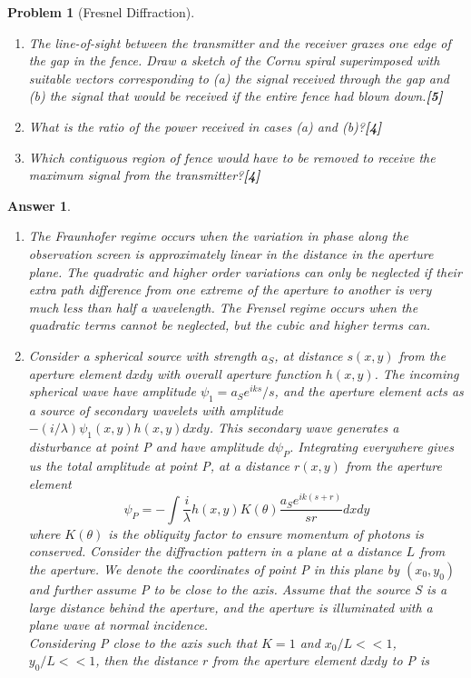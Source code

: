 \documentclass[a4paper]{article}
\newtheorem{ans}{Answer}[subsection]
\theoremstyle{new}
\newtheorem{qns}{Problem}[subsection]
\begin{document}
\begin{qns}[Fresnel Diffraction]
\begin{enumerate}[label=(\roman*)]
\begin{figure}[H]
\end{figure}
\item The line-of-sight between the transmitter and the receiver grazes one edge of the gap in the fence. Draw a sketch of the Cornu spiral superimposed with suitable vectors corresponding to (a) the signal received through the gap and (b) the signal that would be received if the entire fence had blown down.\hfill\textbf{[5]}
\item What is the ratio of the power received in cases (a) and (b)?\hfill\textbf{[4]}
\item Which contiguous region of fence would have to be removed to receive the maximum signal from the transmitter?\hfill\textbf{[4]}
\end{enumerate}
\end{qns}
\newpage
\begin{ans}\leavevmode
\begin{enumerate}[label=(\roman*)]
\item The Fraunhofer regime occurs when the variation in phase along the observation screen is approximately linear in the distance in the aperture plane. The quadratic and higher order variations can only be neglected if their extra path difference from one extreme of the aperture to another is very much less than half a wavelength. The Frensel regime occurs when the quadratic terms cannot be neglected, but the cubic and higher terms can.
\item Consider a spherical source with strength $a_S$, at distance $s(x,y)$ from the aperture element $dxdy$ with overall aperture function $h(x,y)$. The incoming spherical wave have amplitude $\psi_1=a_Se^{iks}/s$, and the aperture element acts as a source of secondary wavelets with amplitude $-(i/\lambda)\psi_1(x,y)h(x,y)dxdy$. This secondary wave generates a disturbance at point P and have amplitude $d\psi_P$. Integrating everywhere gives us the total amplitude at point P, at a distance $r(x,y)$ from the aperture element
$$\psi_P=-\int\frac{i}{\lambda}h(x,y)K(\theta)\frac{a_Se^{ik(s+r)}}{sr}dxdy$$
where $K(\theta)$ is the obliquity factor to ensure momentum of photons is conserved. Consider the diffraction pattern in a plane at a distance $L$ from the aperture. We denote the coordinates of point P in this plane by $(x_0,y_0)$ and further assume P to be close to the axis. Assume that the source S is a large distance behind the aperture, and the aperture is illuminated with a plane wave at normal incidence.\\[5pt]
Considering P close to the axis such that $K=1$ and $x_0/L<<1$, $y_0/L<<1$, then the distance $r$ from the aperture element $dxdy$ to P is

\end{enumerate}
\end{ans}
\end{document}
